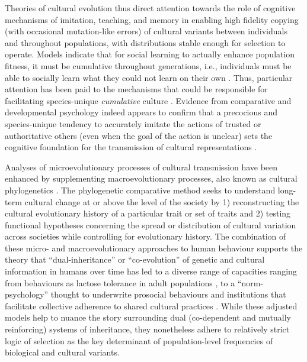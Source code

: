 Theories of cultural evolution thus direct attention towards the role of cognitive mechanisms of imitation, teaching, and memory in enabling high fidelity copying (with occasional mutation-like errors) of cultural variants between individuals and throughout populations, with distributions stable enough for selection to operate.  Models indicate that for social learning to actually enhance population fitness, it must be cumulative throughout generations, i.e., individuals must be able to socially learn what they could not learn on their own \citep{Boyd1995}.  Thus, particular attention has been paid to the mechanisms that could be responsible for facilitating species-unique \textit{cumulative} culture \citep{Tomasello2008}.  Evidence from comparative and developmental psychology indeed appears to confirm that a precocious and species-unique tendency to accurately imitate the actions of trusted or authoritative others (even when the goal of the action is unclear) sets the cognitive foundation for the transmission of cultural representations \citep{Tomasello2014a}.

Analyses of microevolutionary processes of cultural transmission have been enhanced by supplementing macroevolutionary processes, also known as cultural phylogenetics \citep{Mace1994}.  The phylogenetic comparative method seeks to understand long-term cultural change at or above the level of the society by 1) reconstructing the cultural evolutionary history of a particular trait or set of traits and 2) testing functional hypotheses concerning the spread or distribution of cultural variation across societies while controlling for evolutionary history.  The combination of these micro- and macroevolutionary approaches to human behaviour supports the theory that  ``dual-inheritance'' or ``co-evolution'' of genetic and cultural information in humans over time has led to a diverse range of capacities ranging from behaviours as lactose tolerance in adult populations \citep{Feldman1989}, to a ``norm-psychology'' thought to underwrite prosocial behaviours and institutions that facilitate collective adherence to shared cultural practices \citep{Richerson2008,Chudek2011}.  While these adjusted models help to nuance the story surrounding dual (co-dependent and mutually reinforcing) systems of inheritance, they nonetheless adhere to relatively strict logic of selection as the key determinant of population-level frequencies of biological and cultural variants.



